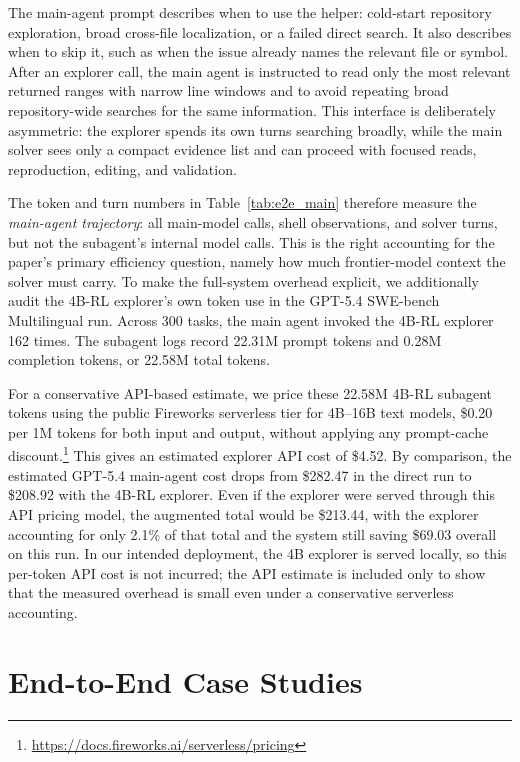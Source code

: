 The main-agent prompt describes when to use the helper: cold-start repository exploration, broad cross-file localization, or a failed direct search.
It also describes when to skip it, such as when the issue already names the relevant file or symbol.
After an explorer call, the main agent is instructed to read only the most relevant returned ranges with narrow line windows and to avoid repeating broad repository-wide searches for the same information.
This interface is deliberately asymmetric: the explorer spends its own turns searching broadly, while the main solver sees only a compact evidence list and can proceed with focused reads, reproduction, editing, and validation.

The token and turn numbers in Table~\ref{tab:e2e_main} therefore measure the \emph{main-agent trajectory}: all main-model calls, shell observations, and solver turns, but not the subagent's internal model calls.
This is the right accounting for the paper's primary efficiency question, namely how much frontier-model context the solver must carry.
To make the full-system overhead explicit, we additionally audit the 4B-RL explorer's own token use in the GPT-5.4 SWE-bench Multilingual run.
Across 300 tasks, the main agent invoked the 4B-RL explorer 162 times.
The subagent logs record 22.31M prompt tokens and 0.28M completion tokens, or 22.58M total tokens.



For a conservative API-based estimate, we price these 22.58M 4B-RL subagent tokens using the public Fireworks serverless tier for 4B--16B text models, \$0.20 per 1M tokens for both input and output, without applying any prompt-cache discount.\footnote{\url{https://docs.fireworks.ai/serverless/pricing}}
This gives an estimated explorer API cost of \$4.52.
By comparison, the estimated GPT-5.4 main-agent cost drops from \$282.47 in the direct run to \$208.92 with the 4B-RL explorer.
Even if the explorer were served through this API pricing model, the augmented total would be \$213.44, with the explorer accounting for only 2.1\% of that total and the system still saving \$69.03 overall on this run.
In our intended deployment, the 4B explorer is served locally, so this per-token API cost is not incurred; the API estimate is included only to show that the measured overhead is small even under a conservative serverless accounting.


\section{End-to-End Case Studies}
\label{app:case-study}

